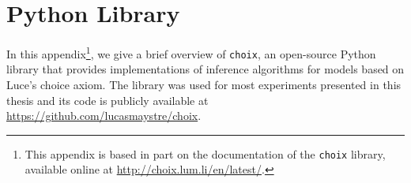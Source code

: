 \chapter{Python Library}
\label{ch:choix}

In this appendix\footnote{%
This appendix is based in part on the documentation of the \texttt{choix} library, available online at \url{http://choix.lum.li/en/latest/}.},
we give a brief overview of \texttt{choix}, an open-source Python library that provides implementations of inference algorithms for models based on Luce's choice axiom.
The library was used for most experiments presented in this thesis and its code is publicly available at \url{https://github.com/lucasmaystre/choix}.



